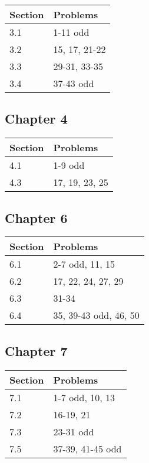\documentclass[
]{book}
\begin{document}
\begin{tabular}{l|l}
\hline
Section & Problems\\
\hline
3.1 & 1-11 odd\\
\hline
3.2 & 15, 17, 21-22\\
\hline
3.3 & 29-31, 33-35\\
\hline
3.4 & 37-43 odd\\
\hline
\end{tabular}

\hypertarget{chapter-4-1}{%
\subsection{Chapter 4}\label{chapter-4-1}}

\begin{tabular}{l|l}
\hline
Section & Problems\\
\hline
4.1 & 1-9 odd\\
\hline
4.3 & 17, 19, 23, 25\\
\hline
\end{tabular}

\hypertarget{chapter-6-1}{%
\subsection{Chapter 6}\label{chapter-6-1}}

\begin{tabular}{l|l}
\hline
Section & Problems\\
\hline
6.1 & 2-7 odd, 11, 15\\
\hline
6.2 & 17, 22, 24, 27, 29\\
\hline
6.3 & 31-34\\
\hline
6.4 & 35, 39-43 odd, 46, 50\\
\hline
\end{tabular}

\hypertarget{chapter-7-1}{%
\subsection{Chapter 7}\label{chapter-7-1}}

\begin{tabular}{l|l}
\hline
Section & Problems\\
\hline
7.1 & 1-7 odd, 10, 13\\
\hline
7.2 & 16-19, 21\\
\hline
7.3 & 23-31 odd\\
\hline
7.5 & 37-39, 41-45 odd\\
\hline
\end{tabular}
\end{document}
